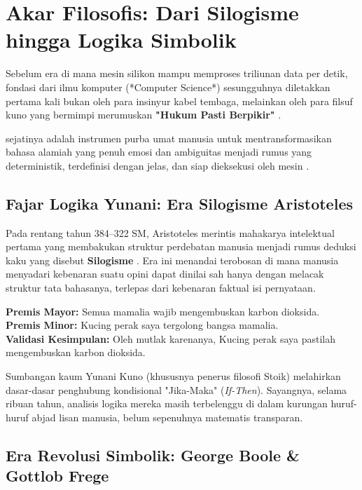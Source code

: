 \section{Akar Filosofis: Dari Silogisme hingga Logika Simbolik}

Sebelum era di mana mesin silikon mampu memproses triliunan data per detik, fondasi dari ilmu komputer (*Computer Science*) sesungguhnya diletakkan pertama kali bukan oleh para insinyur kabel tembaga, melainkan oleh para filsuf kuno yang bermimpi merumuskan \textbf{"Hukum Pasti Berpikir"} \cite{wiki_proplogic}. 

 sejatinya adalah instrumen purba umat manusia untuk mentransformasikan bahasa alamiah yang penuh emosi dan ambiguitas menjadi rumus yang deterministik, terdefinisi dengan jelas, dan siap dieksekusi oleh mesin \cite{rosen2019,copi2014,forallx}.

\subsection{Fajar Logika Yunani: Era Silogisme Aristoteles}

Pada rentang tahun 384--322 SM, Aristoteles merintis mahakarya intelektual pertama yang membakukan struktur perdebatan manusia menjadi rumus deduksi kaku yang disebut \textbf{Silogisme} \cite{iep_logic_history}. Era ini menandai terobosan di mana manusia menyadari kebenaran suatu opini dapat dinilai sah hanya dengan melacak struktur tata bahasanya, terlepas dari kebenaran faktual isi pernyataan.

\begin{contoh}
\indent \textbf{Premis Mayor:} Semua mamalia wajib mengembuskan karbon dioksida. \\
\indent \textbf{Premis Minor:} Kucing perak saya tergolong bangsa mamalia. \\
\indent \textbf{Validasi Kesimpulan:} Oleh mutlak karenanya, Kucing perak saya pastilah mengembuskan karbon dioksida.
\end{contoh}

Sumbangan kaum Yunani Kuno (khususnya penerus filosofi Stoik) melahirkan dasar-dasar penghubung kondisional "Jika-Maka" (\textit{If-Then}). Sayangnya, selama ribuan tahun, analisis logika mereka masih terbelenggu di dalam kurungan huruf-huruf abjad lisan manusia, belum sepenuhnya matematis transparan.

\subsection{Era Revolusi Simbolik: George Boole \& Gottlob Frege}

